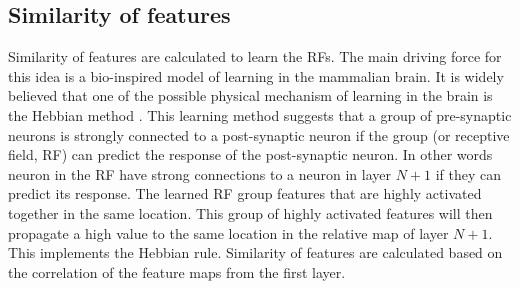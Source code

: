 \documentclass{article} %
\begin{document}




\subsection{Similarity of features}
\label{sec-similarity}
Similarity of features are calculated to learn the RFs. The main driving force for this idea is a bio-inspired model of learning in the mammalian brain. It is widely believed that one of the possible physical mechanism of learning in the brain is the Hebbian method \cite{masquelier2007learning}. This learning method suggests that a group of pre-synaptic neurons is strongly connected to a post-synaptic neuron if the group (or receptive field, RF) can predict the response of the post-synaptic neuron. In other words neuron in the RF have strong connections to a neuron in layer $N+1$ if they can predict its response. The learned RF group features that are highly activated together in the same location. This group of highly activated features will then propagate a high value to the same location in the relative map of layer $N+1$. This implements the Hebbian rule. Similarity of features are calculated based on the correlation of the feature maps from the first layer. 



\end{document}
